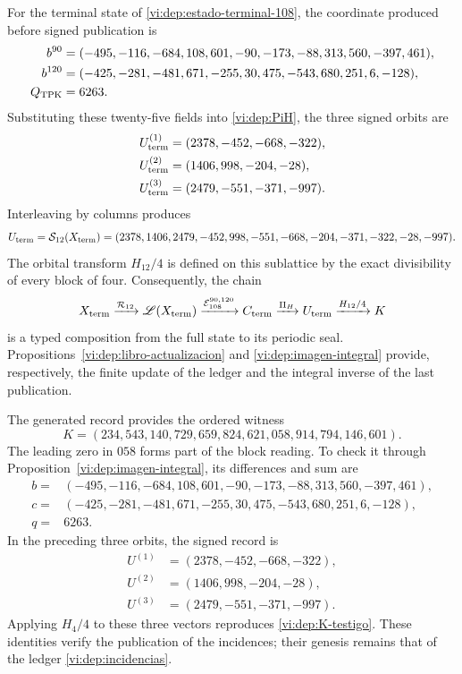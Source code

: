 For the terminal state of \eqref{vi:dep:estado-terminal-108}, the coordinate
produced before signed publication is
\begin{align}
 b^{90}={}&(-495,-116,-684,108,601,-90,
              -173,-88,313,560,-397,461),\notag\\
 b^{120}={}&(-425,-281,-481,671,-255,30,
               475,-543,680,251,6,-128),\notag\\
 Q_{\rm TPK}={}&6263.
 \label{vi:dep:canales-terminales}
\end{align}
Substituting these twenty-five fields into \eqref{vi:dep:PiH}, the three
signed orbits are
\begin{align*}
 U_{\rm term}^{(1)}&=(2378,-452,-668,-322),\\
 U_{\rm term}^{(2)}&=(1406,998,-204,-28),\\
 U_{\rm term}^{(3)}&=(2479,-551,-371,-997).
\end{align*}
Interleaving by columns produces
\begin{equation}
 U_{\rm term}=\mathcal S_{12}(X_{\rm term})
 =(2378,1406,2479,-452,998,-551,-668,-204,-371,-322,-28,-997).
 \label{vi:dep:U-terminal}
\end{equation}
The orbital transform \(H_{12}/4\) is defined on this sublattice by
the exact divisibility of every block of four. Consequently, the chain
\begin{equation}
 X_{\rm term}\xrightarrow{\mathcal R_{12}}\mathscr L(X_{\rm term})
 \xrightarrow{\mathcal E_{108}^{90,120}}C_{\rm term}
 \xrightarrow{\Pi_H}U_{\rm term}
 \xrightarrow{H_{12}/4}K
 \label{vi:dep:cadena-terminal-completa}
\end{equation}
is a typed composition from the full state to its periodic seal.
Propositions~\ref{vi:dep:libro-actualizacion} and
\ref{vi:dep:imagen-integral} provide, respectively, the finite update
of the ledger and the integral inverse of the last publication.

The generated record provides the ordered witness
\begin{equation}
 K=(234,543,140,729,659,824,621,058,914,794,146,601).
 \label{vi:dep:K-testigo}
\end{equation}
The leading zero in \(058\) forms part of the block reading.
To check it through Proposition~\ref{vi:dep:imagen-integral}, its differences
and sum are
\[
\begin{split}
b={}&(-495,-116,-684,108,601,-90,-173,-88,313,560,-397,461),\\
c={}&(-425,-281,-481,671,-255,30,475,-543,680,251,6,-128),\\
q={}&6263.
\end{split}
\]
In the preceding three orbits, the signed record is
\[
 \begin{aligned}
 U^{(1)}&=(2378,-452,-668,-322),\\
 U^{(2)}&=(1406,998,-204,-28),\\
 U^{(3)}&=(2479,-551,-371,-997).
 \end{aligned}
\]
Applying \(H_4/4\) to these three vectors reproduces
\eqref{vi:dep:K-testigo}. These identities verify the publication of
the incidences; their genesis remains that of the ledger
\eqref{vi:dep:incidencias}.

